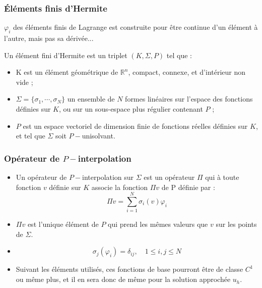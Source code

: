 \documentclass{beamer}
\begin{document}
\begin{frame}
\begin{center}
 \end{center}
 

\end{frame}
\begin{frame}
\frametitle{Éléments finis d'Hermite}
$\varphi_i$ des éléments finis de Lagrange est construite pour être continue d'un élément à l'autre, mais pas sa dérivée... 

Un élément fini d'Hermite est un triplet $(K,\Sigma,P)$ tel que :
\begin{itemize}
\item K est un élément géométrique de $\mathbb{R}^n$, compact, connexe, et d'intérieur non vide ;
\item $\Sigma=\{\sigma_1,\cdots,\sigma_N\}$ un ensemble de $N$ formes linéaires sur l'espace des fonctions définies sur $K$, ou sur un sous-espace plus régulier contenant $P$ ;
\item $P$ est un espace vectoriel de dimension finie de fonctions réelles définies sur $K$, et tel que $\Sigma$ soit $P-$unisolvant.
\end{itemize}
\end{frame}
\begin{frame}
\frametitle{Opérateur de $P-$interpolation }


\begin{itemize}
\item Un opérateur de $P-$interpolation sur $\Sigma$ est un opérateur $\Pi$ qui à toute fonction $v$ définie sur $K$ associe la fonction $\Pi v$ de P définie par :
\[\Pi v=\sum_{i=1}^N\sigma_i(v)\varphi_i\]
\item $\Pi v$  est l'unique élément de $P$ qui prend les mêmes valeurs que $v$ sur les points de $\Sigma$.
\item
\[\sigma_j(\varphi_i)=\delta_{ij},\quad 1\leq i,j \leq N\]
\item Suivant les éléments utilisés, ces fonctions de base pourront être de classe $C^1$ ou même plus, et il en sera donc de même pour la solution approchée $u_h$.
\end{itemize}

\end{frame}
\end{document}
